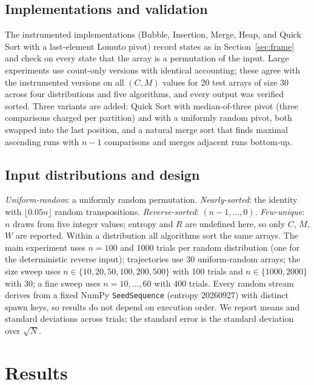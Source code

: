 \documentclass[10pt,journal]{IEEEtran}
\begin{document}
\subsection{Implementations and validation}
The instrumented implementations (Bubble, Insertion, Merge, Heap, and Quick Sort with a last-element Lomuto pivot) record states as in Section~\ref{sec:frame} and check on every state that the array is a permutation of the input. Large experiments use count-only versions with identical accounting; these agree with the instrumented versions on all $(C,M)$ values for 20 test arrays of size 30 across four distributions and five algorithms, and every output was verified sorted. Three variants are added: Quick Sort with median-of-three pivot (three comparisons charged per partition) and with a uniformly random pivot, both swapped into the last position, and a natural merge sort that finds maximal ascending runs with $n-1$ comparisons and merges adjacent runs bottom-up.

\subsection{Input distributions and design}
\emph{Uniform-random}: a uniformly random permutation. \emph{Nearly-sorted}: the identity with $\lfloor 0.05n\rfloor$ random transpositions. \emph{Reverse-sorted}: $(n-1,\dots,0)$. \emph{Few-unique}: $n$ draws from five integer values; entropy and $R$ are undefined here, so only $C$, $M$, $W$ are reported. Within a distribution all algorithms sort the same arrays. The main experiment uses $n=100$ and 1000 trials per random distribution (one for the deterministic reverse input); trajectories use 30 uniform-random arrays; the size sweep uses $n\in\{10,20,50,100,200,500\}$ with 100 trials and $n\in\{1000,2000\}$ with 30; a fine sweep uses $n=10,\dots,60$ with 400 trials. Every random stream derives from a fixed NumPy \texttt{SeedSequence} (entropy 20260927) with distinct spawn keys, so results do not depend on execution order. We report means and standard deviations across trials; the standard error is the standard deviation over $\sqrt N$.

\section{Results}
\end{document}
